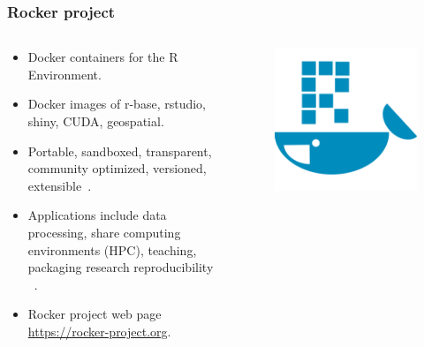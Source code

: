 \documentclass[aspectratio=169]{beamer}
\begin{document}
\begin{frame}
    \frametitle{Rocker project}
    \begin{columns}
        \begin{column}{0.5\textwidth}
            \begin{itemize}
                \item Docker containers for the R 
                    Environment.
                \item Docker images of r-base, rstudio, shiny, CUDA,
                    geospatial.
                \item Portable, sandboxed, transparent, community optimized,
                    versioned, extensible~\cite{boettiger2017}.
                \item Applications include 
                    data processing,
                    share computing environments (HPC), teaching, packaging
                    research reproducibility ~\cite{nust2020}.
                \item Rocker project web page \url{https://rocker-project.org}.
            \end{itemize}
        \end{column}
        \begin{column}{0.5\textwidth}
            \begin{figure}
                \centering
                \includegraphics[scale=0.25]{logos/rocker.png}
            \end{figure}
        \end{column}
    \end{columns}
\end{frame}
\end{document}
